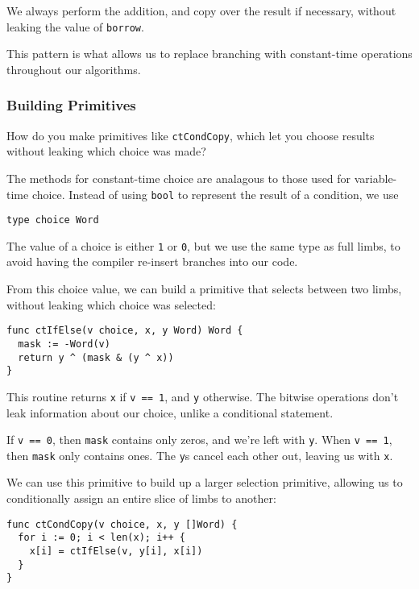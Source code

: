 \documentclass[11pt, a4paper]{article} %
\begin{document}
{We always perform the addition, and copy over the result if necessary,
without leaking the value of \texttt{borrow}.

This pattern is what allows us to replace
branching with constant-time operations throughout
our algorithms.

\subsubsection{Building Primitives}

How do you make primitives like
\texttt{ctCondCopy}, which let you choose results without
leaking which choice was made?

The methods for constant-time choice are analagous to
those used for variable-time choice. Instead of using
\texttt{bool} to represent the result of a condition, we use

\begin{verbatim}
type choice Word
\end{verbatim}

The value of a choice is either \texttt{1} or \texttt{0},
but we use the same
type as full limbs, to avoid having the compiler
re-insert branches into our code.

From this choice value, we can build a primitive that selects
between two limbs, without leaking which choice was selected:

\begin{verbatim}
func ctIfElse(v choice, x, y Word) Word {
  mask := -Word(v)
  return y ^ (mask & (y ^ x))
} 
\end{verbatim}

This routine returns \texttt{x} if
\texttt{v == 1}, and \texttt{y} otherwise.
The bitwise operations don't leak information about
our choice, unlike a conditional statement.

If \texttt{v == 0}, then \texttt{mask} contains only zeros, and we're left
with \texttt{y}. When \texttt{v == 1},
then \texttt{mask} only contains ones. The \texttt{y}s cancel each
other out,
leaving us with \texttt{x}.

We can use this primitive to build up a larger selection primitive,
allowing us to conditionally
assign an entire slice of limbs to another:

\begin{verbatim}
func ctCondCopy(v choice, x, y []Word) {
  for i := 0; i < len(x); i++ {
    x[i] = ctIfElse(v, y[i], x[i])
  }
}
\end{verbatim}

}
\end{document}
